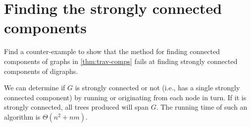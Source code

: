 
\section{Finding the strongly connected components}

%


\begin{Boxample}[4]
Find a counter-example to show that the method for finding connected components of graphs in \cref{thm:trav-comps}  fails at finding strongly connected components of digraphs.
\end{Boxample}


We can determine if $G$ is strongly connected or not (i.e., has a single strongly connected component) by running   or 
originating from each node in turn. If it is strongly connected, all trees produced will span $G$. The running time of such an
algorithm is $\Theta(n^2+nm)$.

